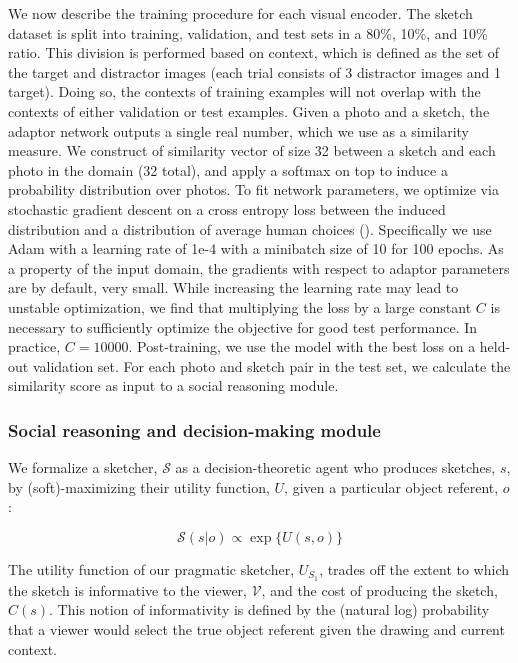 \documentclass[9pt,twocolumn,twoside]{pnas-new}
\newcommand{\mwu}[1]{{\color{green}{[mwu: #1]}}}
\begin{document}
{%
We now describe the training procedure for each visual encoder. The sketch dataset is split into training, validation, and test sets in a 80\%, 10\%, and 10\% ratio. This division is performed based on context, which is defined as the set of the target and distractor images (each trial consists of 3 distractor images and 1 target). Doing so, the contexts of training examples will not overlap with the contexts of either validation or test examples. Given a photo and a sketch, the adaptor network outputs a single real number, which we use as a similarity measure. We construct of similarity vector of size 32 between a sketch and each photo in the domain (32 total), and apply a softmax on top to induce a probability distribution over photos. To fit network parameters, we optimize via stochastic gradient descent on a cross entropy loss between the induced distribution and a distribution of average human choices (\mwu{@judy add more details about how we get labels}). Specifically we use Adam \cite[]{kingma2014adam} with a learning rate of 1e-4 with a minibatch size of 10 for 100 epochs. As a property of the input domain, the gradients with respect to adaptor parameters are by default, very small. While increasing the learning rate may lead to unstable optimization, we find that multiplying the loss by a large constant $C$ is necessary to sufficiently optimize the objective for good test performance. In practice, $C = 10000$. Post-training, we use the model with the best loss on a held-out validation set. For each photo and sketch pair in the test set, we calculate the similarity score as input to a social reasoning module.

\subsubsection*{Social reasoning and decision-making module}

We formalize a sketcher, $\mathcal{S}$ as a decision-theoretic agent who produces sketches, $s$, by (soft)-maximizing their utility function, $U$, given a particular object referent, $o$:

\begin{equation}
\mathcal{S}(s|o) \propto \exp\{{U(s,o)\}}
\end{equation}

The utility function of our pragmatic sketcher, $U_{S_1}$,  trades off the extent to which the sketch is informative to the viewer, $\mathcal{V}$, and the cost of producing the sketch, $C(s)$. This notion of informativity is defined by the (natural log) probability that a viewer would select the true object referent given the drawing and current context.

}
\end{document}
